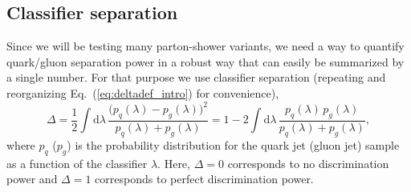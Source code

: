 \documentclass[11pt,letterpaper]{article}
\DeclareRobustCommand{\Eq}[1]{Eq.~(\ref{#1})}
\begin{document}
\subsection{Classifier separation}
\label{sec:classsep}

Since we will be testing many parton-shower variants, we need a way to
quantify quark/gluon separation power in a robust way that can easily
be summarized by a single number.  For that purpose we use classifier
separation  (repeating and reorganizing \Eq{eq:deltadef_intro} for convenience),
\begin{equation}
\label{eq:deltadef}
\Delta
 =  \frac{1}{2} \int \text{d} \lambda \,
    \frac{\bigl(p_q(\lambda) - p_g(\lambda)\bigr)^2}{p_q(\lambda) + p_g(\lambda)}
 =  1- 2\int \text{d} \lambda \, \frac{p_q(\lambda) \, p_g(\lambda)}{p_q(\lambda) + p_g(\lambda)},
\end{equation}
where $p_q$ ($p_g$) is the probability distribution for the quark jet (gluon jet) sample as a function of the classifier $\lambda$.  Here, $\Delta = 0$ corresponds to no discrimination power and $\Delta = 1$ corresponds to perfect discrimination power.
\end{document}
